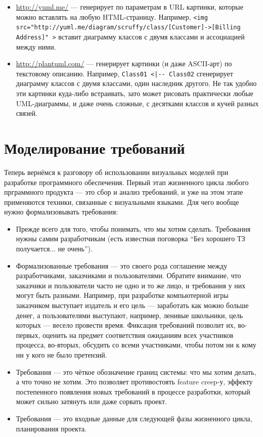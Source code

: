 \documentclass[a5paper]{article}
\begin{document}
\begin{itemize}
\begin{itemize}
        \item \url{http://yuml.me/} --- генерирует по параметрам в URL картинки, которые можно вставлять на любую HTML-страницу. Например, \verb|<img src="http://yuml.me/diagram/scruffy/class/[Customer]->[Billing Address]" >| вставит диаграмму классов с двумя классами и ассоциацией между ними.
        \item \url{http://plantuml.com/} --- генерирует картинки (и даже ASCII-арт) по текстовому описанию. Например, \verb&Class01 <|-- Class02& сгенерирует диаграмму классов с двумя классами, один наследник другого. Не так удобно эти картинки куда-либо встраивать, зато может рисовать практически любые UML-диаграммы, и даже очень сложные, с десятками классов и кучей разных связей.
    \end{itemize}
\end{itemize}

\section{Моделирование требований}

Теперь вернёмся к разговору об использовании визуальных моделей при разработке программного обеспечения. Первый этап жизненного цикла любого прграммного продукта --- это сбор и анализ требований, и уже на этом этапе применяются техники, связанные с визуальными языками. Для чего вообще нужно формализовывать требования:

\begin{itemize}
    \item Прежде всего для того, чтобы понимать, что мы хотим сделать. Требования нужны самим разработчикам (есть известная поговорка ``Без хорошего ТЗ получается... не очень'').
    \item Формализованные требования --- это своего рода соглашение между разработчиками, заказчиками и пользователями. Обратите внимание, что заказчики и пользователи часто не одно и то же лицо, и требования у них могут быть разными. Например, при разработке компьютерной игры заказчиком выступает издатель и его цель --- заработать как можно больше денег, а пользователями выступают, например, ленивые школьники, цель которых --- весело провести время. Фиксация требований позволит их, во-первых, оценить на предмет соответствия ожиданиям всех участников процесса, во-вторых, обсудить со всеми участниками, чтобы потом ни к кому ни у кого не было претензий.
    \item Требования --- это чёткое обозначение границ системы: что мы хотим делать, а что точно не хотим. Это позволяет противостоять feature creep-у, эффекту постепенного появления новых требований в процессе разработки, который может сильно затянуть или даже сорвать проект.
    \item Требования --- это входные данные для следующей фазы жизненного цикла, планирования проекта.
\end{itemize}
\end{document}
